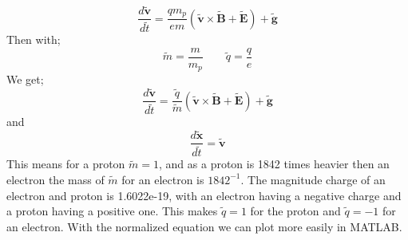 \documentclass[14paper,11pt,hidelinks]{article}
\begin{document}
\begin{equation}
\frac{d\tilde{\mathbf{v}}}{d\tilde{t}}=\frac{qm_p}{em}\left(\tilde{\mathbf{v}}\times\tilde{\mathbf{B}}+\tilde{\mathbf{E}}\right)+\tilde{\mathbf{g}}
\end{equation}
Then with;
\begin{equation}
\tilde{m}=\frac{m}{m_p}
\qquad
\tilde{q}=\frac{q}{e}
\end{equation}
We get;
\begin{equation}
\frac{d\tilde{\mathbf{v}}}{d\tilde{t}}=\frac{\tilde{q}}{\tilde{m}}\left(\tilde{\mathbf{v}}\times\tilde{\mathbf{B}}+\tilde{\mathbf{E}}\right)+\tilde{\mathbf{g}}
\end{equation}
and
\begin{equation}
\frac{d\tilde{\mathbf{x}}}{d\tilde{t}}=\tilde{\mathbf{v}}
\end{equation}
This means for a proton \begin{math} \tilde{m}=1\end{math}, and as a proton is 1842 times heavier then an electron the mass of  \begin{math} \tilde{m}\end{math}  for an electron is \begin{math} 1842^{-1} \end{math}. The magnitude charge of an electron and proton is 1.6022e-19, with an electron having a negative charge and a proton having a positive one. This makes \begin{math} \tilde{q}=1\end{math} for the proton and \begin{math} \tilde{q}=-1\end{math} for an electron. With the normalized equation we can plot more easily in MATLAB.


\end{document}
